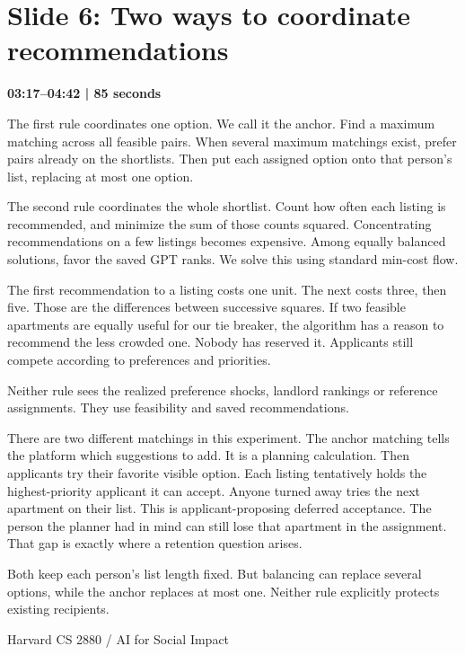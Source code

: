 \documentclass[11pt]{article}
\begin{document}
\section*{Slide 6: Two ways to coordinate recommendations}
{\color{navy}\textbf{03:17--04:42 | 85 seconds}}\par\medskip
The first rule coordinates one option. We call it the anchor. Find a maximum matching across all feasible pairs. When several maximum matchings exist, prefer pairs already on the shortlists. Then put each assigned option onto that person's list, replacing at most one option.
\par
The second rule coordinates the whole shortlist. Count how often each listing is recommended, and minimize the sum of those counts squared. Concentrating recommendations on a few listings becomes expensive. Among equally balanced solutions, favor the saved GPT ranks. We solve this using standard min-cost flow.
\par
The first recommendation to a listing costs one unit. The next costs three, then five. Those are the differences between successive squares. If two feasible apartments are equally useful for our tie breaker, the algorithm has a reason to recommend the less crowded one. Nobody has reserved it. Applicants still compete according to preferences and priorities.
\par
Neither rule sees the realized preference shocks, landlord rankings or reference assignments. They use feasibility and saved recommendations.
\par
There are two different matchings in this experiment. The anchor matching tells the platform which suggestions to add. It is a planning calculation. Then applicants try their favorite visible option. Each listing tentatively holds the highest-priority applicant it can accept. Anyone turned away tries the next apartment on their list. This is applicant-proposing deferred acceptance. The person the planner had in mind can still lose that apartment in the assignment. That gap is exactly where a retention question arises.
\par
Both keep each person's list length fixed. But balancing can replace several options, while the anchor replaces at most one. Neither rule explicitly protects existing recipients.
\par
\newpage
{\small Harvard CS 2880 / AI for Social Impact}\par
\end{document}
